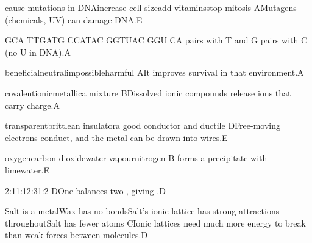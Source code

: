 \begin{gradebody}
{cause mutations in DNA}{increase cell size}{add vitamins}{stop mitosis}
{A}{Mutagens (chemicals, UV) can damage DNA.}{E}

{GCA TTG}{ATG CCA}{TAC GGT}{UAC GGU}
{C}{A pairs with T and G pairs with C (no U in DNA).}{A}

{beneficial}{neutral}{impossible}{harmful}
{A}{It improves survival in that environment.}{A}

{covalent}{ionic}{metallic}{a mixture}
{B}{Dissolved ionic compounds release ions that carry charge.}{A}

{transparent}{brittle}{an insulator}{a good conductor and ductile}
{D}{Free-moving electrons conduct, and the metal can be drawn into wires.}{E}

{oxygen}{carbon dioxide}{water vapour}{nitrogen}
{B}{ forms a  precipitate with limewater.}{E}

{2:1}{1:1}{2:3}{1:2}
{D}{One  balances two , giving .}{D}

{Salt is a metal}{Wax has no bonds}{Salt's ionic lattice has strong attractions throughout}{Salt has fewer atoms}
{C}{Ionic lattices need much more energy to break than weak forces between molecules.}{D}

\end{gradebody}
\probstats
